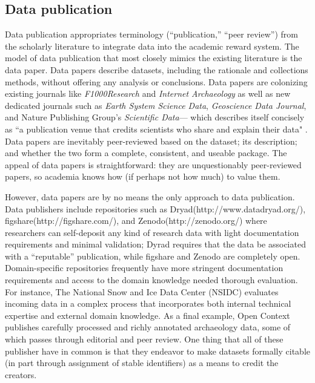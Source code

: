 \documentclass[10pt]{article}
\begin{document}
\subsection*{Data publication}
 
Data publication appropriates terminology (``publication,'' ``peer review'') from the scholarly literature to integrate data into the academic reward system\cite{costello_motivating_2009, lawrence_data_2011, atici_other_2012}.
The model of data publication that most closely mimics the existing literature is the data paper.
Data papers describe datasets, including the rationale and collections methods, without offering any analysis or conclusions\cite{newman_data_2009, callaghan_processes_2013}.
Data papers are colonizing existing journals like \emph{F1000Research} and \emph{Internet Archaeology} as well as new dedicated journals such as \emph{Earth System Science Data}, \emph{Geoscience Data Journal}\cite{allan_geoscience_2014}, and Nature Publishing Group's \emph{Scientific Data}--- which describes itself concisely as ``a publication venue that credits scientists who share and explain their data" \cite{editors_more_2014}.
Data papers are inevitably peer-reviewed based on the dataset; its description; and whether the two form a complete, consistent, and useable package\cite{lawrence_data_2011}.
The appeal of data papers is straightforward: they are unquestionably peer-reviewed papers, so academia knows how (if perhaps not how much) to value them.

However, data papers are by no means the only approach to data publication.
Data publishers include repositories such as Dryad(http://www.datadryad.org/), figshare(http://figshare.com/), and Zenodo(http://zenodo.org/) where researchers can self-deposit any kind of research data with light documentation requirements and minimal validation; Dyrad requires that the data be associated with a ``reputable'' publication, while figshare and Zenodo are completely open.
Domain-specific repositories frequently have more stringent documentation requirements and access to the domain knowledge needed thorough evaluation.
For instance, The National Snow and Ice Data Center (NSIDC) evaluates incoming data in a complex process that incorporates both internal technical expertise and external domain knowledge\cite{weaver_data_2012}.
As a final example, Open Context publishes carefully processed and richly annotated archaeology data, some of which passes through editorial and peer review\cite{kansa_we_2013}.
One thing that all of these publisher have in common is that they endeavor to make datasets formally citable (in part through assignment of stable identifiers) as a means to credit the creators.
\end{document}
